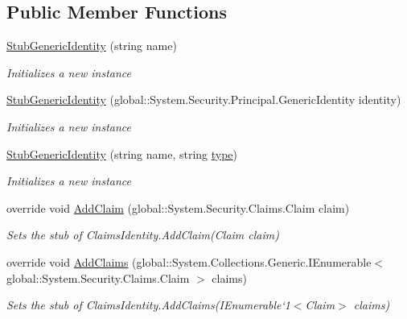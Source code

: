 \subsection*{Public Member Functions}
\begin{DoxyCompactItemize}
\item 
\hyperlink{class_system_1_1_security_1_1_principal_1_1_fakes_1_1_stub_generic_identity_a97cdf77918263f2902e838b8fb287608}{Stub\-Generic\-Identity} (string name)
\begin{DoxyCompactList}\small\item\em Initializes a new instance\end{DoxyCompactList}\item 
\hyperlink{class_system_1_1_security_1_1_principal_1_1_fakes_1_1_stub_generic_identity_af7fca3d381becc8d02e07ba5c5289390}{Stub\-Generic\-Identity} (global\-::\-System.\-Security.\-Principal.\-Generic\-Identity identity)
\begin{DoxyCompactList}\small\item\em Initializes a new instance\end{DoxyCompactList}\item 
\hyperlink{class_system_1_1_security_1_1_principal_1_1_fakes_1_1_stub_generic_identity_a936007950b0c94846b7825689e936310}{Stub\-Generic\-Identity} (string name, string \hyperlink{jquery-1_810_82-vsdoc_8js_a3940565e83a9bfd10d95ffd27536da91}{type})
\begin{DoxyCompactList}\small\item\em Initializes a new instance\end{DoxyCompactList}\item 
override void \hyperlink{class_system_1_1_security_1_1_principal_1_1_fakes_1_1_stub_generic_identity_ab703fa2e32138394c5a02e4df86b2b31}{Add\-Claim} (global\-::\-System.\-Security.\-Claims.\-Claim claim)
\begin{DoxyCompactList}\small\item\em Sets the stub of Claims\-Identity.\-Add\-Claim(\-Claim claim)\end{DoxyCompactList}\item 
override void \hyperlink{class_system_1_1_security_1_1_principal_1_1_fakes_1_1_stub_generic_identity_a8b0b50fff04ff792c9f47c2d95fe53f6}{Add\-Claims} (global\-::\-System.\-Collections.\-Generic.\-I\-Enumerable$<$ global\-::\-System.\-Security.\-Claims.\-Claim $>$ claims)
\begin{DoxyCompactList}\small\item\em Sets the stub of Claims\-Identity.\-Add\-Claims(I\-Enumerable`1$<$Claim$>$ claims)\end{DoxyCompactList}\item 

\end{DoxyCompactItemize}
